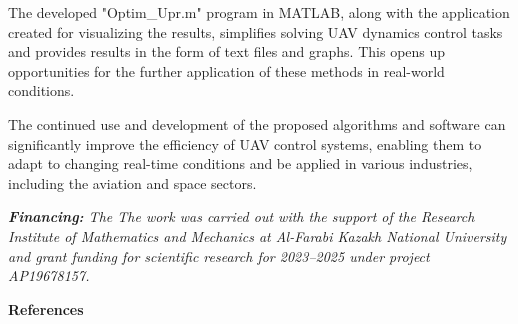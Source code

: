 \begin{multicols}{2}
The developed "Optim\_Upr.m" program in MATLAB, along with the
application created for visualizing the results, simplifies solving UAV
dynamics control tasks and provides results in the form of text files
and graphs. This opens up opportunities for the further application of
these methods in real-world conditions.

The continued use and development of the proposed algorithms and
software can significantly improve the efficiency of UAV control
systems, enabling them to adapt to changing real-time conditions and be
applied in various industries, including the aviation and space sectors.

\emph{{\bfseries Financing:} The The work was carried out with the support
of the Research Institute of Mathematics and Mechanics at Al-Farabi
Kazakh National University and grant funding for scientific research for
2023--2025 under project AP19678157.}

\end{multicols}

\begin{center}
  {\bfseries References}
  \end{center}

